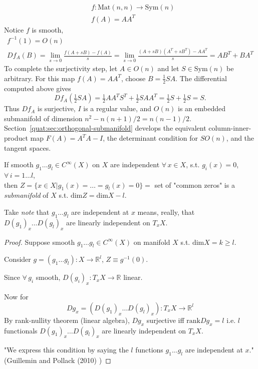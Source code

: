 \[
\begin{aligned}
	& f:\text{Mat}(n,n) \to \text{Sym}(n) \\
	& f(A) = AA^T
\end{aligned}
\]
Notice $f$ is smooth, 
\[
\begin{gathered}
f^{-1}(1) = O(n) \\
Df_A(B) = \lim_{s\to 0} \frac{ f(A+sB) - f(A) }{s} = \lim_{s\to 0} \frac{(A+sB)(A^T + sB^T)- AA^T}{s} = AB^T +BA^T
\end{gathered}
\]
To complete the surjectivity step, let $A\in O(n)$ and let
$S\in\text{Sym}(n)$ be arbitrary. For this map $f(A)=AA^T$, choose
$B=\tfrac12SA$. The differential computed above gives
\[
 Df_A(\tfrac12SA)
 =\tfrac12AA^TS^T+\tfrac12SAA^T
 =\tfrac12S+\tfrac12S=S.
\]
Thus $Df_A$ is surjective, $I$ is a regular value, and
$O(n)$ is an embedded submanifold of dimension
$n^2-n(n+1)/2=n(n-1)/2$. Section~\ref{quat:sec:orthogonal-submanifold}
develops the equivalent column-inner-product map $F(A)=A^TA-I$,
the determinant condition for $SO(n)$, and the tangent spaces.





\begin{proposition} If smooth $g_1\dots g_l \in C^{\infty}(X)$ on $X$ are independent $\forall \, x\in X$, s.t. $g_i(x)=0$, $\forall \, i = 1\dots l$, \\
	then $Z=\lbrace x\in X | g_1(x) = \dots = g_l(x)=0 \rbrace = $ set of "common zeros" is a \emph{submanifold} of $X$ s.t. $\text{dim}Z = \text{dim}X- l$.  
	
	Take \emph{note} that $g_1 \dots g_l$ are independent at $x$ means, really, that $D(g_1)_x \dots D(g_l)_x$ are linearly independent on $T_xX$.  
\end{proposition}
\begin{proof}
Suppose smooth $g_1 \dots g_l \in C^{\infty}(X)$ on manifold $X$ s.t. $\text{dim}X = k\geq l$.  

Consider $g=(g_1\dots g_l):X \to \mathbb{R}^l$, $Z\equiv g^{-1}(0)$.  

Since $\forall \, g_i$ smooth, $D(g_i)_x:T_xX \to \mathbb{R}$ linear.  

Now for 
\[
Dg_x = (D(g_1)_x \dots D(g_l)_x):T_xX \to \mathbb{R}^l
\]	
By rank-nullity theorem (linear algebra), $Dg_x$ surjective iff $\text{rank}Dg_x = l$ i.e. $l$ functionals $D(g_1)_x \dots D(g_l)_x$ are linearly independent on $T_xX$.  

"We express this condition by saying the $l$ functions $g_1\dots g_l$ are independent at $x$."  (Guillemin and Pollack (2010) \cite{dgdt:VGuilleminAPollack2010})  
	
	
	\end{proof}

